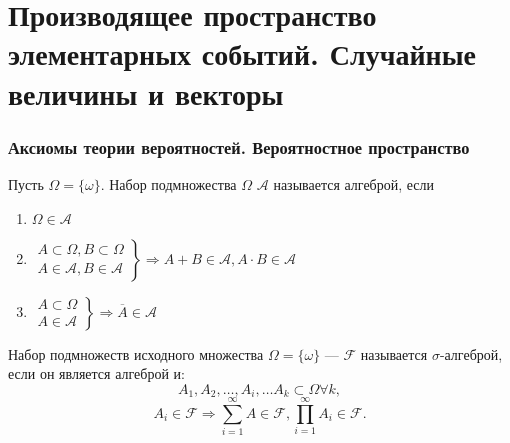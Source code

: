 \part{Производящее пространство элементарных событий. Случайные величины и векторы}
\setcounter{equation}{0}
\section{Аксиомы теории вероятностей. Вероятностное пространство}
\begin{definition}
	Пусть $\Omega = \{\omega\}$. Набор подмножества $\Omega$ $\mathcal{A}$ называется алгеброй, если
	\begin{enumerate}
		\item $\Omega \in \mathcal{A}$
		\item $\left.
			      \begin{aligned}
				      A \subset \Omega, B \subset \Omega \\
				      A \in \mathcal{A}, B \in \mathcal{A}
			      \end{aligned}
			      \right\} \Rightarrow A + B \in \mathcal{A}, A \cdot B \in \mathcal{A}$
		\item $\left.
			      \begin{aligned}
				      A \subset \Omega \\
				      A \in \mathcal{A}
			      \end{aligned}
			      \right\} \Rightarrow \overline{A} \in \mathcal{A}$
	\end{enumerate}
\end{definition}
\begin{definition}
	Набор подмножеств исходного множества $\Omega = \{\omega\}$ --- $\mathcal{F}$ называется $\sigma$-алгеброй, если он является алгеброй и:
	\[
		A_1, A_2, \dots, A_i, \dots A_k \subset \Omega \forall k,
	\]
	\[
		A_i \in \mathcal{F} \Rightarrow \sum\limits_{i=1}^\infty A \in \mathcal{F}, \prod\limits_{i=1}^\infty A_i \in \mathcal{F}.
	\]
\end{definition}
